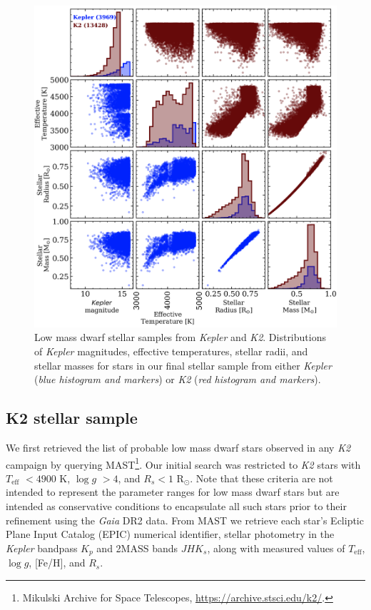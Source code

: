 \documentclass[twocolumn]{emulateapj}
\newcommand{\gaia}[1]{\emph{Gaia}#1}
\newcommand{\kepler}[1]{\emph{Kepler}#1}
\newcommand{\ktwo}[1]{\emph{K2}#1}
\newcommand{\teff}[1]{$T_{\text{eff}}$#1}
\newcommand{\logg}[1]{$\log{g}$#1}
\begin{document}
\begin{figure}
  \centering
  \includegraphics[width=0.98\hsize]{figures/stellar_corner_KepandK2.png}
  \caption{Low mass dwarf stellar samples from \kepler{} and \ktwo{.} Distributions of \kepler{} magnitudes,
    effective temperatures, stellar radii, and stellar masses for stars in our final stellar sample from either
    \kepler{} (\emph{blue histogram and markers}) or \ktwo{} (\emph{red histogram and markers}).}
  \label{fig:stars}
\end{figure}

\subsection{K2 stellar sample}
We first retrieved the list of probable low mass dwarf stars observed in any \ktwo{} campaign by querying
MAST\footnote{Mikulski Archive for Space Telescopes, \url{https://archive.stsci.edu/k2/}.}. Our initial
search was restricted to \ktwo{} stars with \teff{} $<4900$ K, \logg{} $>4$, and $R_s<1$ R$_{\odot}$. Note that these
criteria are not intended to represent the parameter ranges for low mass dwarf stars but are intended as
conservative conditions to encapsulate all such stars prior to their refinement using the \gaia{} DR2
data. From MAST we retrieve each star's Ecliptic Plane Input Catalog
(EPIC) numerical identifier, stellar photometry in the \kepler{} bandpass $K_p$ and 2MASS bands $JHK_s$, along
with measured values of \teff{,} \logg{,} [Fe/H], and $R_s$.
\end{document}
